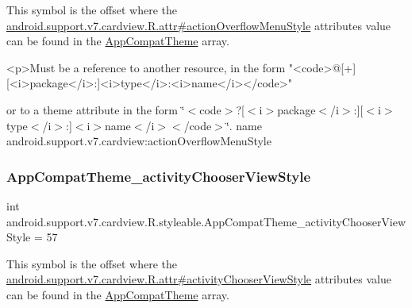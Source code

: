 This symbol is the offset where the \hyperlink{classandroid_1_1support_1_1v7_1_1cardview_1_1R_1_1attr_a50256030a433db5bbcd0af91e846f686}{android.\+support.\+v7.\+cardview.\+R.\+attr\#action\+Overflow\+Menu\+Style} attribute\textquotesingle{}s value can be found in the \hyperlink{classandroid_1_1support_1_1v7_1_1cardview_1_1R_1_1styleable_a52e6f69f954ecc2622d72c0b4d298938}{App\+Compat\+Theme} array.

\begin{DoxyVerb}      <p>Must be a reference to another resource, in the form "<code>@[+][<i>package</i>:]<i>type</i>:<i>name</i></code>"
\end{DoxyVerb}
 or to a theme attribute in the form \char`\"{}$<$code$>$?\mbox{[}$<$i$>$package$<$/i$>$\+:\mbox{]}\mbox{[}$<$i$>$type$<$/i$>$\+:\mbox{]}$<$i$>$name$<$/i$>$$<$/code$>$\char`\"{}.  name android.\+support.\+v7.\+cardview\+:action\+Overflow\+Menu\+Style \mbox{\label{classandroid_1_1support_1_1v7_1_1cardview_1_1R_1_1styleable_ab298049998a791e2af26b0dc51e76b10}} 
\subsubsection{\texorpdfstring{App\+Compat\+Theme\+\_\+activity\+Chooser\+View\+Style}{AppCompatTheme\_activityChooserViewStyle}}
{\footnotesize\ttfamily int android.\+support.\+v7.\+cardview.\+R.\+styleable.\+App\+Compat\+Theme\+\_\+activity\+Chooser\+View\+Style = 57\hspace{0.3cm}{\ttfamily [static]}}

This symbol is the offset where the \hyperlink{classandroid_1_1support_1_1v7_1_1cardview_1_1R_1_1attr_a7807051f48f250aef8e6742672cc4ef7}{android.\+support.\+v7.\+cardview.\+R.\+attr\#activity\+Chooser\+View\+Style} attribute\textquotesingle{}s value can be found in the \hyperlink{classandroid_1_1support_1_1v7_1_1cardview_1_1R_1_1styleable_a52e6f69f954ecc2622d72c0b4d298938}{App\+Compat\+Theme} array.

